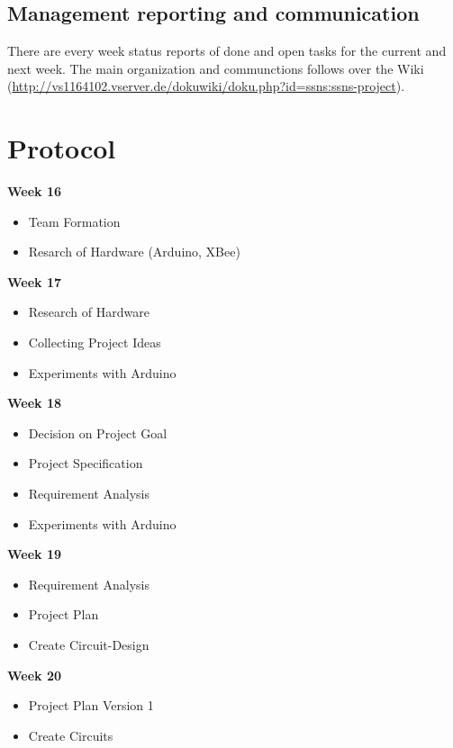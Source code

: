 \documentclass[
	11pt,
	a4paper
]{article}%
\begin{document}
\subsection{Management reporting and communication}
There are every week status reports of done and open tasks for the current and next week. The main organization and communctions follows over the Wiki (\url{http://vs1164102.vserver.de/dokuwiki/doku.php?id=ssns:ssns-project}).

\newpage
\section{Protocol}
\large{\textbf{Week 16}}
\begin{itemize}
\item Team Formation
\item Resarch of Hardware (Arduino, XBee)
\end{itemize}
\large{\textbf{Week 17}}
\begin{itemize}
\item Research of Hardware
\item Collecting Project Ideas
\item Experiments with Arduino
\end{itemize}
\large{\textbf{Week 18}}
\begin{itemize}
\item Decision on Project Goal
\item Project Specification
\item Requirement Analysis
\item Experiments with Arduino
\end{itemize}
\large{\textbf{Week 19}}
\begin{itemize}
\item Requirement Analysis
\item Project Plan
\item Create Circuit-Design
\end{itemize}
\large{\textbf{Week 20}}
\begin{itemize}
\item Project Plan Version 1
\item Create Circuits
\end{itemize}
\end{document}
